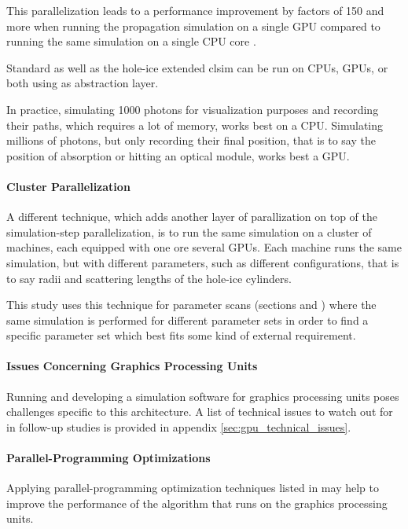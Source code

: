 This parallelization leads to a performance improvement by factors of 150 and more when running the propagation simulation on a single GPU compared to running the same simulation on a single CPU core \cite{ppcpaper}.

Standard  as well as the hole-ice extended clsim can be run on CPUs, GPUs, or both using  as abstraction layer.

In practice, simulating 1000 photons for visualization purposes and recording their paths, which requires a lot of memory, works best on a CPU. Simulating millions of photons, but only recording their final position, that is to say the position of absorption or hitting an optical module, works best a GPU.


\paragraph{Cluster Parallelization}
A different technique, which adds another layer of parallization on top of the simulation-step parallelization, is to run the same simulation on a cluster of machines, each equipped with one ore several GPUs. Each machine runs the same simulation, but with different parameters, such as different configurations, that is to say radii and scattering lengths of the hole-ice cylinders.

This study uses this technique for parameter scans (sections  and ) where the same simulation is performed for different parameter sets in order to find a specific parameter set which best fits some kind of external requirement.


\paragraph{Issues Concerning Graphics Processing Units}
Running and developing a simulation software for graphics processing units poses challenges specific to this architecture. A list of technical issues to watch out for in follow-up studies is provided in appendix \ref{sec:gpu_technical_issues}.


\paragraph{Parallel-Programming Optimizations}
Applying parallel-programming optimization techniques listed in  may help to improve the performance of the algorithm that runs on the graphics processing units.

